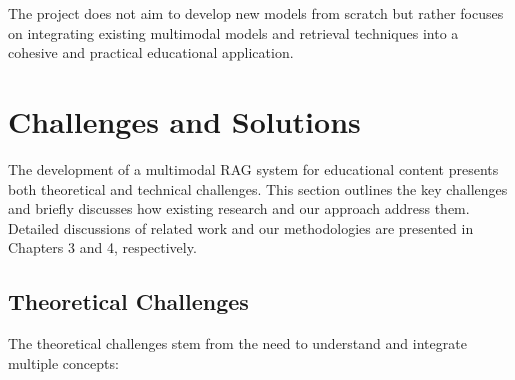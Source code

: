 The project does not aim to develop new models from scratch but rather focuses on integrating existing multimodal models and retrieval techniques into a cohesive and practical educational application.

\section{Challenges and Solutions}

The development of a multimodal RAG system for educational content presents both theoretical and technical challenges. This section outlines the key challenges and briefly discusses how existing research and our approach address them. Detailed discussions of related work and our methodologies are presented in Chapters 3 and 4, respectively.

\subsection*{Theoretical Challenges}

The theoretical challenges stem from the need to understand and integrate multiple concepts:

